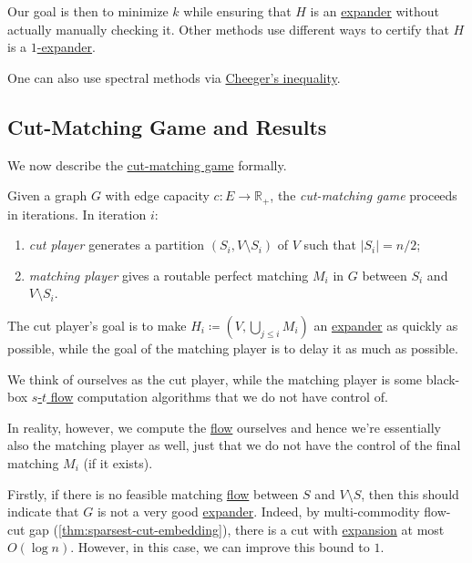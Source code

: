 Our goal is then to minimize \(k\) while ensuring that \(H\) is an \hyperref[def:expander]{expander} without actually manually checking it. Other methods use different ways to certify that \(H\) is a \hyperref[def:expander]{\(1\)-expander}.

\begin{eg}
	One can also use spectral methods via \hyperref[thm:Cheeger-inequality]{Cheeger's inequality}.
\end{eg}

\subsection{Cut-Matching Game and Results}
We now describe the \hyperref[def:cut-matching-game]{cut-matching game} formally.

\begin{definition}\label{def:cut-matching-game}
	Given a graph \(G\) with edge capacity \(c\colon E \to \mathbb{R} _{+}\), the \emph{cut-matching game} proceeds in iterations. In iteration \(i\):
	\begin{enumerate}
		\item \emph{cut player} generates a partition \((S_i, V\setminus S_i)\) of \(V\) such that \(\lvert S_i \rvert = n / 2\);
		\item \emph{matching player} gives a routable perfect matching \(M_i\) in \(G\) between \(S_i\) and \(V \setminus S_i\).
	\end{enumerate}
	The cut player's goal is to make \(H_i \coloneqq (V, \bigcup_{j \leq i} M_i)\) an \hyperref[def:expander]{expander} as quickly as possible, while the goal of the matching player is to delay it as much as possible.
\end{definition}

We think of ourselves as the cut player, while the matching player is some black-box \hyperref[prb:s-t-max-flow]{\(s\)-\(t\) flow} computation algorithms that we do not have control of.

\begin{intuition}
	In reality, however, we compute the \hyperref[def:flow]{flow} ourselves and hence we're essentially also the matching player as well, just that we do not have the control of the final matching \(M_i\) (if it exists).
\end{intuition}

Firstly, if there is no feasible matching \hyperref[def:flow]{flow} between \(S\) and \(V\setminus S\), then this should indicate that \(G\) is not a very good \hyperref[def:expander]{expander}. Indeed, by multi-commodity flow-cut gap (\autoref{thm:sparsest-cut-embedding}), there is a cut with \hyperref[def:expansion]{expansion} at most \(O(\log n)\). However, in this case, we can improve this bound to \(1\).


